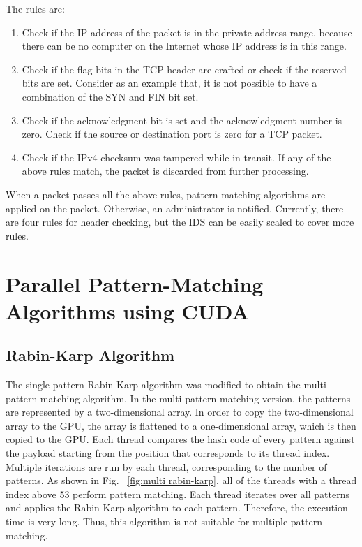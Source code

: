 The rules are:
\begin{enumerate}[leftmargin=*]
	\item
	Check if the IP address of the packet is in the private address range, because there can be no computer on the Internet whose IP address is in this range.
	\item
	Check if the flag bits in the TCP header are crafted or check if the reserved bits are set. Consider as an example that, it is not possible to have a combination of the SYN and FIN bit set.
	\item
	Check if the acknowledgment bit is set and the acknowledgment number is zero. Check if the source or destination port is zero for a TCP packet.
	\item
	Check if the IPv4 checksum was tampered while in transit.
	If any of the above rules match, the packet is discarded from further processing.
\end{enumerate}
\vspace{\topsep}
When a packet passes all the above rules, pattern-matching algorithms are applied on the packet. Otherwise, an administrator is notified. Currently, there are four rules for header checking, but the IDS can be easily scaled to cover more rules.

\section{Parallel Pattern-Matching Algorithms using CUDA}
\vspace{\topsep}
\subsection{Rabin-Karp Algorithm}
The single-pattern Rabin-Karp algorithm was modified to obtain the multi-pattern-matching algorithm. In the multi-pattern-matching version, the patterns are represented by a two-dimensional array. In order to copy the two-dimensional array to the GPU, the array is flattened to a one-dimensional array, which is then copied to the GPU. 
Each thread compares the hash code of every pattern against the payload starting from the position that corresponds to its thread index.\\ Multiple iterations are run by each thread, corresponding to the number of patterns. As shown in Fig. ~\ref{fig:multi rabin-karp}, all of the threads with a thread index above 53 perform pattern matching. Each thread iterates over all patterns and applies the Rabin-Karp algorithm to each pattern. Therefore, the execution time is very long. Thus, this algorithm is not suitable for multiple pattern matching.

